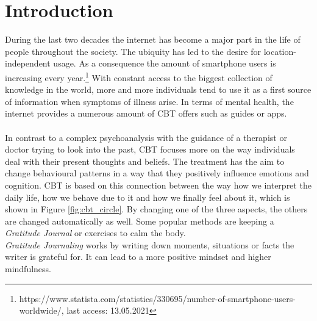 \documentclass[sigconf, nonacm]{acmart}
\begin{document}
\keywords{}

\maketitle

\section{Introduction}
During the last two decades the internet has become a major part in the life
of people throughout the society. The ubiquity has led to the desire for 
location-independent usage. As a consequence the amount of
smartphone users is increasing every year.\footnote{https://www.statista.com/statistics/330695/number-of-smartphone-users-worldwide/, last access: 13.05.2021}
With constant access to the biggest collection of knowledge in the world,
more and more individuals tend to use it as a first source of information when
symptoms of illness arise\cite{Wyatt2015}. 
In terms of mental health, the internet provides a numerous amount of CBT offers such as guides
or apps. 
\\\\
In contrast to a complex psychoanalysis with the guidance of a therapist or doctor trying to look into the past,
CBT focuses more on the way individuals deal with their present thoughts and beliefs. The treatment has the aim to
change behavioural patterns in a way that they positively influence emotions and cognition. CBT is based on this connection
between the way how we interpret the daily life, how we behave due to it and how we finally feel about it, which is shown in Figure \ref{fig:cbt_circle}. By changing one of the three aspects,
the others are changed automatically as well. Some popular methods are keeping a \emph{Gratitude Journal} or exercises to calm the body.\cite{Spangler2002}
\\
\emph{Gratitude Journaling} works by writing down moments, situations or facts the writer is grateful for. It can lead to a more positive mindset and higher mindfulness. 
\end{document}
